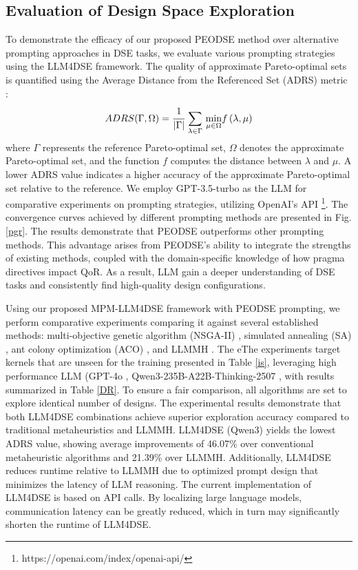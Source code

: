 \documentclass[conference]{IEEEtran}
\begin{document}
	\subsection{Evaluation of Design Space Exploration}
	To demonstrate the efficacy of our proposed PEODSE method over alternative prompting approaches in DSE tasks, we evaluate various prompting strategies using the LLM4DSE framework. The quality of approximate Pareto-optimal sets is quantified using the Average Distance from the Referenced Set (ADRS) metric \cite{Schafer2019}:	
	\begin{equation}
		ADRS(\Gamma,\Omega) = \cfrac{1}{|\Gamma|}\ \underset{\lambda \in \Gamma}{\sum}\ \underset{\mu \in \Omega}{\min}f\left(\lambda, \mu \right)
		\label{9}
	\end{equation}
	where $\Gamma$ represents the reference Pareto-optimal set, $\Omega$ denotes the approximate Pareto-optimal set, and the function $f$ computes the distance between $\lambda$ and $\mu$. A lower ADRS value indicates a higher accuracy of the approximate Pareto-optimal set relative to the reference. We employ GPT-3.5-turbo \cite{ouyang2022} as the LLM for comparative experiments on prompting strategies, utilizing OpenAI's API \footnote{https://openai.com/index/openai-api/}. The convergence curves achieved by different prompting methods are presented in Fig. \ref{pgr}. The results demonstrate that PEODSE outperforms other prompting methods. This advantage arises from PEODSE’s ability to integrate the strengths of existing methods, coupled with the domain-specific knowledge of how pragma directives impact QoR. As a result, LLM gain a deeper understanding of DSE tasks and consistently find high-quality design configurations. 

	
    Using our proposed MPM-LLM4DSE framework with PEODSE prompting, we perform comparative experiments comparing it against several established methods:  multi-objective genetic algorithm (NSGA-II) \cite{Schafer2017}, simulated annealing (SA) \cite{Schafer2009}, ant colony optimization (ACO) \cite{Schafer2016}, and LLMMH \cite{xu2025}. The eThe experiments target kernels that are unseen for the training presented in Table \ref{is}, leveraging high performance LLM (GPT-4o \cite{gpt4o2024}, Qwen3-235B-A22B-Thinking-2507 \cite{yang2025}, with results summarized in Table \ref{DR}. To ensure a fair comparison, all algorithms are set to explore identical number of designs. The experimental results demonstrate that both LLM4DSE combinations achieve superior exploration accuracy compared to traditional metaheuristics and LLMMH. LLM4DSE (Qwen3) yields the lowest ADRS value, showing average improvements of 46.07\% over conventional metaheuristic algorithms and 21.39\% over LLMMH. Additionally, LLM4DSE reduces runtime relative to LLMMH due to optimized prompt design that minimizes the latency of LLM reasoning. The current implementation of LLM4DSE is based on API calls. By localizing large language models, communication latency can be greatly reduced, which in turn may significantly shorten the runtime of LLM4DSE.
    
\end{document}
